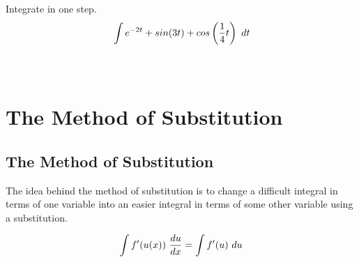 \begin{exercise}\nonumber
    Integrate in one step. \\

    \begin{align}
         & \int e^{-2t} + sin(3t) + cos\left({1 \over 4}t\right) \ dt \\
        \\
        \\
    \end{align}
\end{exercise}

\chapter{The Method of Substitution}

\section{The Method of Substitution}

The idea behind the method of substitution is to change a difficult integral in terms of one variable into an easier integral in terms of some other variable using a substitution. \\

\begin{theorem}
    \begin{align}
        \int f'(u(x)) \ {du \over dx} = \int f'(u) \ du
    \end{align}
\end{theorem}

